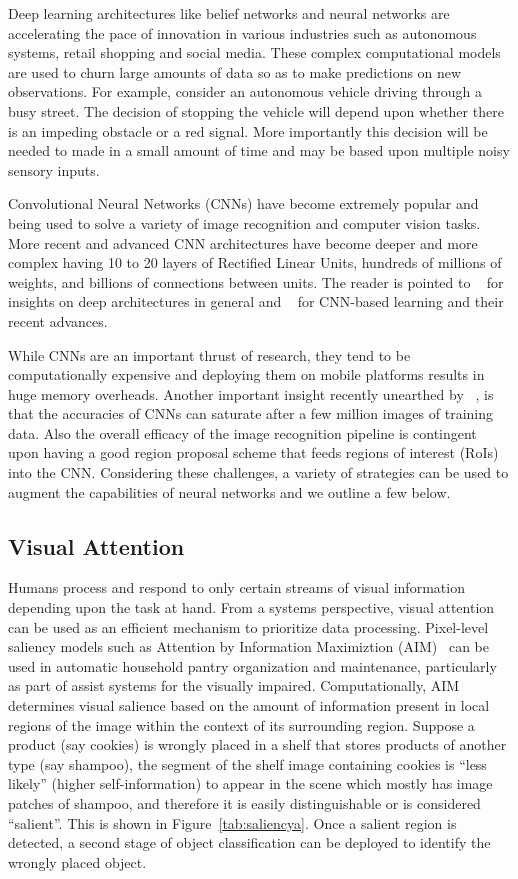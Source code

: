 Deep learning architectures like belief networks and neural networks are accelerating the pace of innovation in various industries such as autonomous systems, 
retail shopping and social media. These complex computational models are used to churn large amounts of data so as to make predictions on new observations. 
For example, consider an autonomous vehicle driving through a busy street. The decision of stopping the vehicle will depend upon whether there is an 
impeding obstacle or a red signal. More importantly this decision will be needed to made in a small amount of time and may be based upon multiple noisy sensory inputs.
 
Convolutional Neural Networks (CNNs) have become extremely popular and being used to solve a variety of image recognition and computer vision tasks. 
More recent and advanced CNN architectures have become deeper and more complex having 10 to 20 
layers of Rectified Linear Units, hundreds of millions of weights, and billions of connections between units.
The reader is pointed to ~\cite{Bengio2009} for insights on deep architectures in general and ~\cite{DNNNature2015} for CNN-based learning and their recent advances.

While CNNs are an important thrust of research, they tend to be computationally expensive and deploying them on mobile platforms results in huge memory overheads. 
Another important insight recently unearthed by ~\cite{facenet}, is that the accuracies of CNNs can saturate after a few million images of training data.
Also the overall efficacy of the image recognition pipeline is contingent upon having a good region proposal scheme that feeds regions of interest (RoIs) into the CNN. 
Considering these challenges, a variety of strategies can be used to augment the capabilities of neural networks and we outline a few below.

\subsection{Visual Attention}
Humans process and respond to only certain streams of visual information depending upon the task at hand. 
From a systems perspective, visual attention can be used as an efficient mechanism to prioritize data processing.  
Pixel-level saliency models such as Attention by Information Maximiztion (AIM)~\cite{Bruceb} can be used in 
automatic household pantry organization and maintenance, particularly 
as part of assist systems for the visually impaired. Computationally, AIM determines visual salience based on the amount of information present in 
local regions of the image within the context of its surrounding region. 
Suppose a product (say cookies) is wrongly placed in a shelf that stores products of another type (say shampoo), the segment of the shelf image containing cookies is 
``less likely'' (higher self-information) to appear in the scene which mostly has image patches of shampoo, 
and therefore it is easily distinguishable or is considered ``salient''. This is shown in Figure~\ref{tab:saliencya}.
Once a salient region is detected, a second stage of object classification can be deployed to identify the wrongly placed object.  

